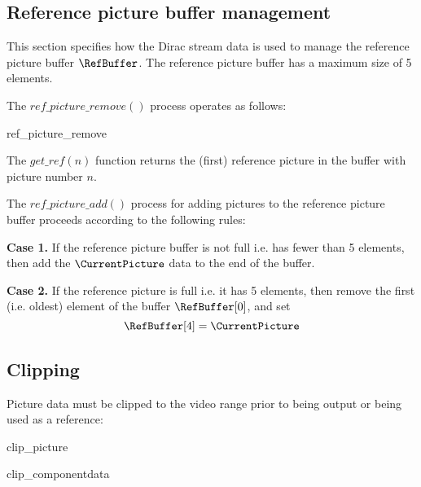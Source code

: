 \subsection{Reference picture buffer management}
\label{refbuffer}

This section specifies how the Dirac stream data is used to manage the reference 
picture buffer $\RefBuffer$. The reference picture buffer has a maximum size of
5 elements.

The $ref\_picture\_remove()$ process operates as
follows:

\begin{pseudo}{ref\_picture\_remove}{}
        \bsEND
    \bsEND
\bsEND
\bsCODE{\RetiredPictureList=\emptyset}
\end{pseudo}

The $get\_ref(n)$ function returns the (first) reference picture in the buffer with 
picture number $n$.  

The $ref\_picture\_add()$ process for adding pictures to the reference picture
buffer proceeds according to the following rules:

{\bf Case 1.} If the reference picture buffer is not full i.e. has fewer than 5 elements,
then add the $\CurrentPicture$ data to the end of the buffer. 

{\bf Case 2.} If the reference picture is full i.e. it has 5 elements, then remove the
first (i.e. oldest) element of the buffer $\RefBuffer[0]$, and set
\[\RefBuffer[4]=\CurrentPicture\]
 
\subsection{Clipping}
\label{pictureclip}

Picture data must be clipped to the video range prior to being output or being
used as a reference:

\begin{pseudo}{clip\_picture}{}
\bsEND
\end{pseudo}

\begin{pseudo}{clip\_component}{data}
     \bsEND
\bsEND
\end{pseudo}